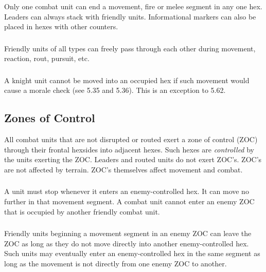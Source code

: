 \subsubsection[Limits]{} Only one combat unit can end a movement, fire or melee segment in any one hex. Leaders can always stack with friendly units. Informational markers can also be placed in hexes with other counters.

\subsubsection[Moving Through Units]{} Friendly units of all types can freely pass through each other during movement, reaction, rout, pursuit, etc.

\subsubsection[Knights and Stacking]{} A knight unit cannot be moved into an occupied hex if such movement would cause a morale check (see 5.35 and 5.36). This is an exception to 5.62.

\subsection{Zones of Control}

All combat units that are not disrupted or routed exert a zone of control (ZOC) through their frontal hexsides into adjacent hexes. Such hexes are \textit{controlled} by the units exerting the ZOC. Leaders and routed units do not exert ZOC's. ZOC's are not affected by terrain. ZOC's themselves affect movement and combat.

\subsubsection[Stopping Movement]{} A unit must stop whenever it enters an enemy-controlled hex. It can move no further in that movement segment. A combat unit cannot enter an enemy ZOC that is occupied by another friendly combat unit.

\subsubsection[Leaving a ZOC]{} Friendly units beginning a movement segment in an enemy ZOC can leave the ZOC as long as they do not move directly into another enemy-controlled hex. Such units may eventually enter an enemy-controlled hex in the same segment as long as the movement is not directly from one enemy ZOC to another.

